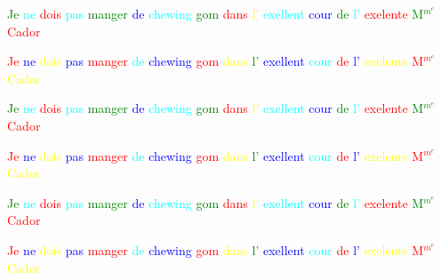 \documentclass[12pt,a4paper]{article}
\begin{document}
\textcolor{green}{Je} \textcolor{cyan}{ne} \textcolor{red}{dois} \textcolor{cyan}{pas} \textcolor{green}{manger} \textcolor{blue}{de} \textcolor{cyan}{chewing} \textcolor{green}{gom} \textcolor{red}{dans} \textcolor{yellow}{l'} \textcolor{cyan}{exellent} \textcolor{blue}{cour} \textcolor{green}{de} \textcolor{cyan}{l'} \textcolor{red}{exelente} \textcolor{green}{M$^m^e$} \textcolor{red}{Cador}

\textcolor{red}{Je} \textcolor{blue}{ne} \textcolor{yellow}{dois} \textcolor{blue}{pas} \textcolor{red}{manger} \textcolor{cyan}{de} \textcolor{blue}{chewing} \textcolor{red}{gom} \textcolor{yellow}{dans} \textcolor{green}{l'} \textcolor{blue}{exellent} \textcolor{cyan}{cour} \textcolor{red}{de} \textcolor{blue}{l'} \textcolor{yellow}{exelente} \textcolor{red}{M$^m^e$} \textcolor{yellow}{Cador}

\textcolor{green}{Je} \textcolor{cyan}{ne} \textcolor{red}{dois} \textcolor{cyan}{pas} \textcolor{green}{manger} \textcolor{blue}{de} \textcolor{cyan}{chewing} \textcolor{green}{gom} \textcolor{red}{dans} \textcolor{yellow}{l'} \textcolor{cyan}{exellent} \textcolor{blue}{cour} \textcolor{green}{de} \textcolor{cyan}{l'} \textcolor{red}{exelente} \textcolor{green}{M$^m^e$} \textcolor{red}{Cador}

\textcolor{red}{Je} \textcolor{blue}{ne} \textcolor{yellow}{dois} \textcolor{blue}{pas} \textcolor{red}{manger} \textcolor{cyan}{de} \textcolor{blue}{chewing} \textcolor{red}{gom} \textcolor{yellow}{dans} \textcolor{green}{l'} \textcolor{blue}{exellent} \textcolor{cyan}{cour} \textcolor{red}{de} \textcolor{blue}{l'} \textcolor{yellow}{exelente} \textcolor{red}{M$^m^e$} \textcolor{yellow}{Cador}

\textcolor{green}{Je} \textcolor{cyan}{ne} \textcolor{red}{dois} \textcolor{cyan}{pas} \textcolor{green}{manger} \textcolor{blue}{de} \textcolor{cyan}{chewing} \textcolor{green}{gom} \textcolor{red}{dans} \textcolor{yellow}{l'} \textcolor{cyan}{exellent} \textcolor{blue}{cour} \textcolor{green}{de} \textcolor{cyan}{l'} \textcolor{red}{exelente} \textcolor{green}{M$^m^e$} \textcolor{red}{Cador}

\textcolor{red}{Je} \textcolor{blue}{ne} \textcolor{yellow}{dois} \textcolor{blue}{pas} \textcolor{red}{manger} \textcolor{cyan}{de} \textcolor{blue}{chewing} \textcolor{red}{gom} \textcolor{yellow}{dans} \textcolor{green}{l'} \textcolor{blue}{exellent} \textcolor{cyan}{cour} \textcolor{red}{de} \textcolor{blue}{l'} \textcolor{yellow}{exelente} \textcolor{red}{M$^m^e$} \textcolor{yellow}{Cador}
\end{document}
